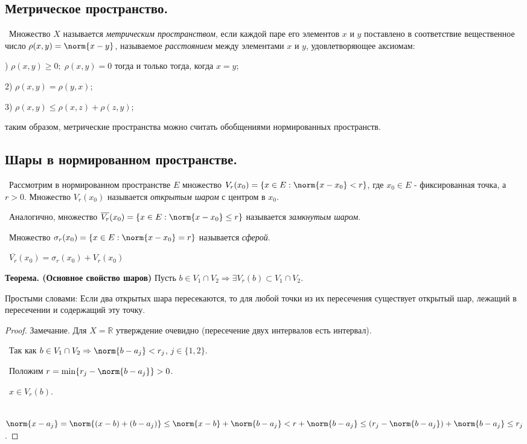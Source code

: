 \subsection*{Метрическое пространство.}

\noindent \textasteriskcentered~Множество $X$ называется \textit{метрическим пространством}, если каждой паре его элементов $x$ и $y$ поставлено в соответствие вещественное число $\rho(x, y) = \norm{x - y}$, называемое \textit{расстоянием} между элементами $x$ и $y$, удовлетворяющее аксиомам:

) $\rho(x, y) \ge 0;\; \rho(x, y) = 0$ тогда и только тогда, когда $x = y$;

2) $\rho(x, y) = \rho(y, x)$;

3) $\rho(x, y) \le \rho(x, z) + \rho(z, y)$;

\smallskip
\noindent таким образом, метрические пространства можно считать обобщениями нормированных пространств.


\subsection*{Шары в нормированном пространстве.}

\noindent \textasteriskcentered~Рассмотрим в нормированном пространстве $E$ множество $V_r(x_0) = 
\{x \in E : \norm{x - x_0} < r\}$, где $x_0 \in E$ - фиксированная точка, а $r > 0$.
Множество $V_r (x_0)$ называется \textit{открытым шаром} с центром в $x_0$.

\smallskip
\noindent \textasteriskcentered~Аналогично, множество $\overline{V_r}(x_0) = \{x \in E : \norm{x - x_0} \le r\}$ называется \textit{замкнутым шаром}.

\smallskip
\noindent \textasteriskcentered~Множество $\sigma_r(x_0) = \{x \in E : \norm{x - x_0} = r\}$ называется \textit{сферой}.

\smallskip
\noindent \textbullet~$\overline{V_r}(x_0) = \sigma_r(x_0) + V_r(x_0)$

\bigskip
\noindent\textbf{Теорема. (Основное свойство шаров)} 
Пусть $b \in V_1 \cap V_2 \Rightarrow \exists V_r(b) \subset V_1 \cap V_2$.

\noindent Простыми словами: Если два открытых шара пересекаются, то для любой точки из их пересечения существует открытый шар, лежащий в пересечении и содержащий эту точку.

\begin{proof}

\noindent Замечание. Для $X = \mathbb{R}$ утверждение очевидно (пересечение двух интервалов есть интервал).

\smallskip
\noindent \textbullet~Так как $b \in V_1 \cap V_2 \Rightarrow \norm{b - a_j} < r_j$, 
$j \in \{1, 2\}$.

\smallskip
\noindent \textbullet~Положим $r = \min\{r_j - \norm{b - a_j}\} > 0$.

\smallskip
\noindent \textbullet~$x \in V_r(b)$.

\smallskip
\noindent \textbullet~$\norm{x - a_j} = \norm{(x - b) + (b - a_j)} \le 
\norm{x - b} + \norm{b - a_j} < r + \norm{b - a_j} \le (r_j - \norm{b - a_j}) + \norm{b - a_j} \le 
r_j$.

\end{proof}


